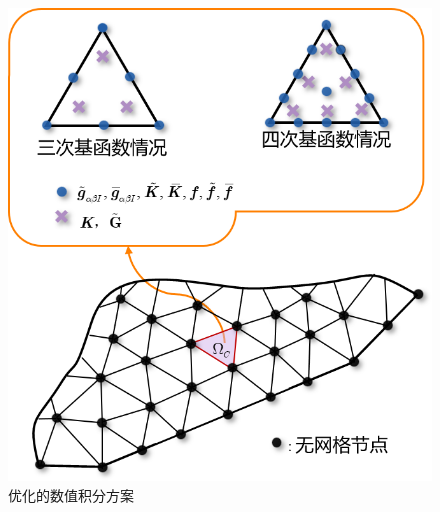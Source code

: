 \begin{figure}[!h]
    \centering
    \includegraphics[scale=0.7]{figure/P/moment.png}
    \caption{优化的数值积分方案}\label{moment}
\end{figure}\newpage
